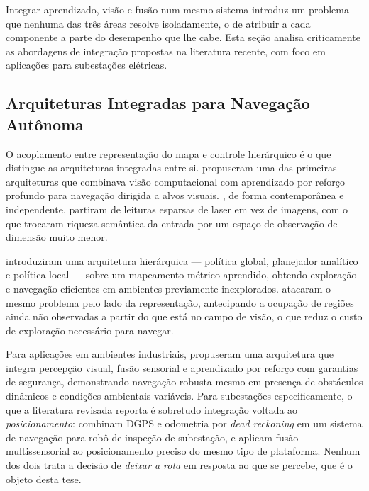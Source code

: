 Integrar aprendizado, visão e fusão num mesmo sistema introduz um problema que nenhuma das três áreas resolve isoladamente, o de atribuir a cada componente a parte do desempenho que lhe cabe. Esta seção analisa criticamente as abordagens de integração propostas na literatura recente, com foco em aplicações para subestações elétricas.

\subsection{Arquiteturas Integradas para Navegação Autônoma}

O acoplamento entre representação do mapa e controle hierárquico é o que distingue as arquiteturas integradas entre si. %
 propuseram uma das primeiras arquiteturas que combinava visão
computacional com aprendizado por reforço profundo para navegação dirigida a alvos
visuais. , de forma contemporânea e independente, partiram de
leituras esparsas de laser em vez de imagens, com o que trocaram riqueza semântica da
entrada por um espaço de observação de dimensão muito menor.

 introduziram uma arquitetura hierárquica --- política global, planejador analítico e política local --- sobre um mapeamento métrico aprendido, obtendo exploração e navegação eficientes em ambientes previamente inexplorados.  atacaram o mesmo problema pelo lado da representação, antecipando a ocupação de regiões ainda não observadas a partir do que está no campo de visão, o que reduz o custo de exploração necessário para navegar.

Para aplicações em ambientes industriais,  propuseram uma arquitetura que integra percepção visual, fusão sensorial e aprendizado por reforço com garantias de segurança, demonstrando navegação robusta mesmo em presença de obstáculos dinâmicos e condições ambientais variáveis.
Para subestações especificamente, o que a literatura revisada reporta é sobretudo
integração voltada ao \emph{posicionamento}:  combinam
DGPS e odometria por \textit{dead reckoning} em um sistema de navegação para robô de
inspeção de subestação, e  aplicam fusão
multissensorial ao posicionamento preciso do mesmo tipo de plataforma. Nenhum dos dois
trata a decisão de \emph{deixar a rota} em resposta ao que se percebe, que é o objeto
desta tese.

